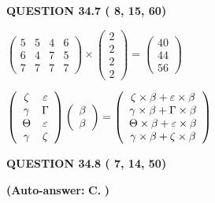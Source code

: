 \documentclass[12pt]{article}
\begin{document}
 
  
  
{\textbf{\large{QUESTION
34.7 
 (          8,         15,         60)
}}}

 
$\left( \begin{array}{ccccccccccccccc}
           5 & 
           5 & 
           4 & 
           6 \\ 
           6 & 
           4 & 
           7 & 
           5 \\ 
           7 & 
           7 & 
           7 & 
           7
\end{array}\right) \times
\left( \begin{array}{c}
           2 \\ 
           2 \\ 
           2 \\ 
           2
\end{array}\right)  =
\left( \begin{array}{c}
          40 \\ 
          44 \\ 
          56
\end{array}\right)  $
 
$  %
 \left( \begin{array}
 {
 c
 c
 }
                    \zeta & 
 \varepsilon \\ 
 \gamma & 
 \Gamma \\ 
 \Theta & 
 \varepsilon \\ 
 \gamma & 
                    \zeta
 \end{array} \right)
 \left( \begin{array}
 {
 c
 }
 \beta \\ 
 \beta
 \end{array} \right)
=
  \left( \begin{array}
 {
 c
 }
                    \zeta \times  \beta   +  \varepsilon \times  \beta \\ 
 \gamma \times  \beta   +  \Gamma \times  \beta \\ 
 \Theta \times  \beta   +  \varepsilon \times  \beta \\ 
 \gamma \times  \beta   +                     \zeta \times  \beta
 \end{array} \right)
$
 
  
  
{\textbf{\large{QUESTION
34.8 
 (          7,         14,         50)
}}}
 
 
{\textbf{(Auto-answer:}}
{\textbf{\large{
C.}}}
{\textbf{)}}
 
 
  
\end{document}

